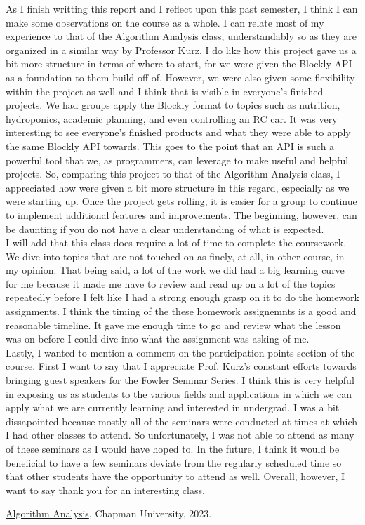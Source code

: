 \documentclass{article}
\theoremstyle{theorem}
\theoremstyle{definition}
\theoremstyle{remark}
\begin{document}
As I finish writting this report and I reflect upon this past semester, I think I can make some observations on the course as a whole. I can relate most of my experience to that of the Algorithm Analysis class, understandably so as they are organized in a similar way by Professor Kurz. 
I do like how this project gave us a bit more structure in terms of where to start, for we were given the Blockly API as a foundation to them build off of. However, we were also given some flexibility within the project as well and I think that is visible in everyone's finished projects. 
We had groups apply the Blockly format to topics such as nutrition, hydroponics, academic planning, and even controlling an RC car. It was very interesting to see everyone's finished products and what they were able to apply the same Blockly API towards. This goes to the point that an API 
is such a powerful tool that we, as programmers, can leverage to make useful and helpful projects. So, comparing this project to that of the Algorithm Analysis class, I appreciated how were given a bit more structure in this regard, especially as we were starting up. Once the project gets rolling, 
it is easier for a group to continue to implement additional features and improvements. The beginning, however, can be daunting if you do not have a clear understanding of what is expected. \\

I will add that this class does require a lot of time to complete the coursework. We dive into topics that are not touched on as finely, at all, in other course, in my opinion. That being said, 
a lot of the work we did had a big learning curve for me because it made me have to review and read up on a lot of the topics repeatedly before I felt like I had a strong enough grasp on it to do the homework assignments. I think the timing of the these homework assignemnts is a good and reasonable timeline. 
It gave me enough time to go and review what the lesson was on before I could dive into what the assignment was asking of me. \\

Lastly, I wanted to mention a comment on the participation points section of the course. First I want to say that I appreciate Prof. Kurz's constant efforts towards bringing guest speakers for the Fowler Seminar Series. I think this is very helpful in exposing us as students to the various 
fields and applications in which we can apply what we are currently learning and interested in undergrad. I was a bit dissapointed because mostly all of the seminars were conducted at times at which I had other classes to attend. So unfortunately, I was not able to attend as many of these seminars 
as I would have hoped to. In the future, I think it would be beneficial to have a few seminars deviate from the regularly scheduled time so that other students have the opportunity to attend as well. Overall, however, I want to say thank you for an interesting class. \\

\begin{thebibliography}{99}
 \href{https://github.com/alexhkurz/algorithm-analysis-2023}{Algorithm Analysis}, Chapman University, 2023.
\end{thebibliography}
\end{document}
